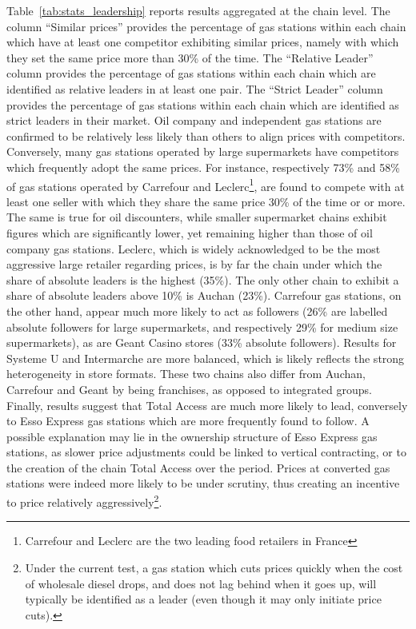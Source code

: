 \documentclass[english]{article}
\begin{document}
Table~\ref{tab:stats_leadership} reports results aggregated at the chain level. The column ``Similar prices'' provides the percentage of gas stations within each chain which have at least one competitor exhibiting similar prices, namely with which they set the same price more than 30\% of the time. The ``Relative Leader'' column provides the percentage of gas stations within each chain which are identified as relative leaders in at least one pair. The ``Strict Leader'' column provides the percentage of gas stations within each chain which are identified as strict leaders in their market. Oil company and independent gas stations are confirmed to be relatively less likely than others to align prices with competitors. Conversely, many gas stations operated by large supermarkets have competitors which frequently adopt the same prices. For instance, respectively 73\% and 58\% of gas stations operated by Carrefour and Leclerc\footnote{Carrefour and Leclerc are the two leading food retailers in France}, are found to compete with at least one seller with which they share the same price 30\% of the time or or more. The same is true for oil discounters, while smaller supermarket chains exhibit figures which are significantly lower, yet remaining higher than those of oil company gas stations.
Leclerc, which is widely acknowledged to be the most aggressive large retailer regarding prices, is by far the chain under which the share of absolute leaders is the highest (35\%). The only other chain to exhibit a share of absolute leaders above 10\% is Auchan (23\%). Carrefour gas stations, on the other hand, appear much more likely to act as followers (26\% are labelled absolute followers for large supermarkets, and respectively 29\% for medium size supermarkets), as are Geant Casino stores (33\% absolute followers). Results for Systeme U and Intermarche are more balanced, which is likely reflects the strong heterogeneity in store formats. These two chains also differ from Auchan, Carrefour and Geant by being franchises, as opposed to integrated groups. Finally, results suggest that Total Access are much more likely to lead, conversely to Esso Express gas stations which are more frequently found to follow. A possible explanation may lie in the ownership structure of Esso Express gas stations, as slower price adjustments could be linked to vertical contracting, or to the creation of the chain Total Access over the period. Prices at converted gas stations were indeed more likely to be under scrutiny, thus creating an incentive to price relatively aggressively\footnote{Under the current test, a gas station which cuts prices quickly when the cost of wholesale diesel drops, and does not lag behind when it goes up, will typically be identified as a leader (even though it may only initiate price cuts).}.
\end{document}
